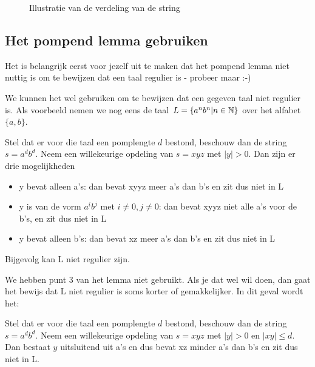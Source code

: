 \begin{figure}[h]
\caption{Illustratie van de verdeling van de string \label{pomp1}}
\end{figure}


\subsection{Het pompend lemma gebruiken}

Het is belangrijk eerst voor
jezelf uit te maken dat het pompend lemma niet nuttig is om te
bewijzen dat een taal regulier is - probeer maar :-)


We kunnen het wel gebruiken om te bewijzen dat een gegeven taal niet
regulier is. Als voorbeeld nemen we nog eens de taal $L = \{a^nb^n|n
\in \mathbb{N}\}$ over het alfabet $\{a,b\}$.  


Stel dat er voor die taal een pomplengte $d$ bestond, beschouw dan de
string $s = a^db^d$. Neem een willekeurige opdeling van $s = xyz$ met
$|y| > 0$. Dan zijn er drie mogelijkheden

\begin{itemize}
\item y bevat alleen a's: dan bevat xyyz meer a's dan b's en zit dus niet in L
\item y is van de vorm $a^ib^j$ met $i \neq 0, j \neq 0$: dan bevat
xyyz niet alle a's voor de b's, en zit dus niet in L
\item y bevat alleen b's: dan bevat xz meer a's dan b's en zit dus niet in L
\end{itemize}

Bijgevolg kan L niet regulier zijn.


We hebben punt 3 van het lemma niet gebruikt. Als je dat wel wil doen,
dan gaat het bewijs dat L niet regulier is soms korter of
gemakkelijker. In dit geval wordt het:


Stel dat er voor die taal een pomplengte $d$ bestond, beschouw dan de
string $s = a^db^d$. Neem een willekeurige opdeling van $s = xyz$ met
$|y| > 0$ en $|xy| \leq d$. Dan bestaat $y$ uitsluitend uit a's en dus
bevat xz minder a's dan b's en zit dus niet in L.



